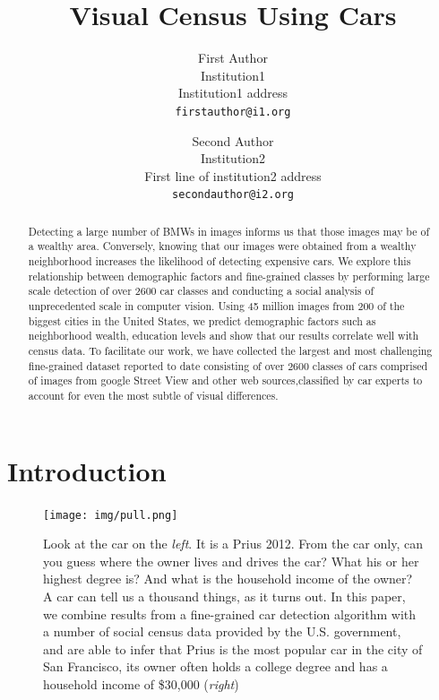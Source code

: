 \documentclass[10pt,twocolumn,letterpaper]{article}
\begin{document}
\title{Visual Census Using Cars}

\author{First Author\\
Institution1\\
Institution1 address\\
{\tt\small firstauthor@i1.org}
\and
Second Author\\
Institution2\\
First line of institution2 address\\
{\tt\small secondauthor@i2.org}
}

\maketitle

\begin{abstract}
Detecting a large number of BMWs in images informs us that those images may be of a wealthy area. Conversely, knowing that our images were obtained from a wealthy neighborhood increases the likelihood of detecting expensive cars. We explore this relationship between demographic factors and fine-grained classes by performing large scale detection of over 2600 car classes and conducting a social analysis of unprecedented scale in computer vision. Using 45 million images from 200 of the biggest cities in the United States, we predict demographic factors such as neighborhood wealth, education levels and show that our results correlate well with census data. To facilitate our work, we have collected the largest and most challenging fine-grained dataset reported to date consisting of over 2600 classes of cars comprised of images from google Street View and other web sources,classified by car experts to account for even the most subtle of visual differences. 
\end{abstract}

\section{Introduction}
\begin{figure}[t]
\begin{center}
   \texttt{[image: img/pull.png]}
\end{center}
   \caption{Look at the car on the {\em left}. It is a Prius 2012. From the car only, can you guess where the owner lives and drives the car? What his or her highest degree is? And what is the household income of the owner? A car can tell us a thousand things, as it turns out. In this paper, we combine results from a fine-grained car detection algorithm with a number of social census data provided by the U.S. government, and are able to infer that Prius is the most popular car in the city of San Francisco, its owner often holds a college degree and has a household income of \$30,000 ({\em right})}
\label{fig:pull}
\end{figure}
\end{document}
